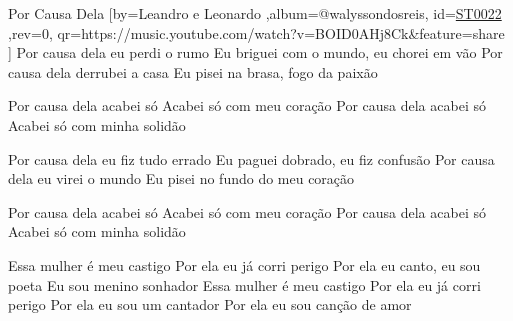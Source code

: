 \beginsong
{Por Causa Dela %
}[by={Leandro e Leonardo %
},album={@walyssondosreis},
id={\href{https://music.youtube.com/watch?v=BOID0AHj8Ck&feature=share %
}{ST0022 %
}},rev={0}, %
qr={https://music.youtube.com/watch?v=BOID0AHj8Ck&feature=share %
}]
\beginverse
Por causa dela eu perdi o rumo
Eu briguei com o mundo, eu chorei em vão
Por causa dela derrubei a casa
Eu pisei na brasa, fogo da paixão
\endverse

\beginverse
Por causa dela acabei só
Acabei só com meu coração
Por causa dela acabei só
Acabei só com minha solidão
\endverse

\beginverse
Por causa dela eu fiz tudo errado
Eu paguei dobrado, eu fiz confusão
Por causa dela eu virei o mundo
Eu pisei no fundo do meu coração
\endverse

\beginverse
Por causa dela acabei só
Acabei só com meu coração
Por causa dela acabei só
Acabei só com minha solidão
\endverse

\beginchorus
Essa mulher é meu castigo
Por ela eu já corri perigo
Por ela eu canto, eu sou poeta
Eu sou menino sonhador
Essa mulher é meu castigo
Por ela eu já corri perigo
Por ela eu sou um cantador
Por ela eu sou canção de amor
\endchorus

